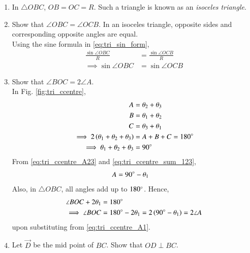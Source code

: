 \renewcommand{\theequation}{\theenumi}
\begin{enumerate}[label=\thesection.\arabic*.,ref=\thesection.\theenumi]
%
\item In $\triangle OBC$, $OB = OC = R$.  Such a triangle is known as an {\em isoceles triangle}.
%
\item Show that $\angle OBC = \angle OCB$.  In an isoceles triangle, opposite sides and corresponding opposite angles are equal.
\label{prob:tri_ang_side_eq}
\\
\solution Using the sine formula in \eqref{eq:tri_sin_form},%
\begin{align}
\frac{\sin \angle OBC}{R} &= \frac{\sin \angle OCB}{R}
\\
\implies \sin \angle OBC &= \sin \angle OCB
\end{align}
%
\item  Show that $\angle BOC = 2\angle A$.
\label{prob:tri_ccentre_subtend}
%
\\
\solution In Fig. \ref{fig:tri_ccentre}, 
%
\begin{align}
%
\label{eq:tri_ccentre_A23}
A &= \theta_2+\theta_3
\\
B &= \theta_1+\theta_2
\\
C &= \theta_3+\theta_1
\\
\implies 2\brak{\theta_1+\theta_2+\theta_3} &= A+B+C =180\degree
\\
\implies \theta_1+\theta_2+\theta_3 &= 90\degree
\label{eq:tri_ccentre_sum_123}
\end{align}
%
From \eqref{eq:tri_ccentre_A23} and \eqref{eq:tri_ccentre_sum_123},
%
\begin{align}
%
\label{eq:tri_ccentre_A1}
A &= 90\degree - \theta_1
\end{align}
%
Also, in $\triangle OBC$, all angles add up to $180\degree$.  Hence, 
%
\begin{align}
\angle BOC + 2\theta_1 &= 180\degree
\\
\implies \angle BOC &= 180\degree - 2\theta_1 = 2 \left(90\degree - \theta_1\right)
= 2\angle A
\end{align}
%
upon substituting from \eqref{eq:tri_ccentre_A1}.
%
\item Let $\vec{D}$ be the mid point of $BC$.  Show that $OD \perp BC$.

\end{enumerate}
